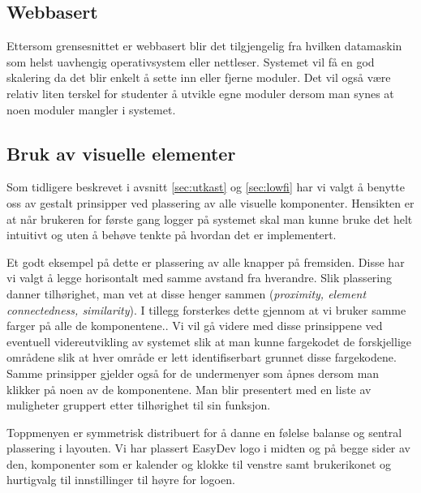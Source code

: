 \subsection{Webbasert}
Ettersom grensesnittet er webbasert blir det tilgjengelig fra hvilken datamaskin som helst uavhengig operativsystem eller nettleser. Systemet vil få en god skalering da det blir enkelt å sette inn eller fjerne moduler. Det vil også være relativ liten terskel for studenter å utvikle egne moduler dersom man synes at noen moduler mangler i systemet. 

\subsection{Bruk av visuelle elementer}
Som tidligere beskrevet i avsnitt \ref{sec:utkast} og \ref{sec:lowfi} har vi valgt å benytte oss av gestalt prinsipper ved plassering av alle visuelle komponenter. Hensikten er at når brukeren for første gang logger på systemet skal man kunne bruke det helt intuitivt og uten å behøve tenkte på hvordan det er implementert.

Et godt eksempel på dette er plassering av alle knapper på fremsiden. Disse har vi valgt å legge horisontalt med samme avstand fra hverandre. Slik plassering danner tilhørighet, man vet at disse henger sammen (\textit{proximity, element connectedness, similarity}). I tillegg forsterkes dette gjennom at vi bruker samme farger på alle de komponentene.\cite{forelesning:tulpesh}. Vi vil gå videre med disse prinsippene ved eventuell videreutvikling av systemet slik at man kunne fargekodet de forskjellige områdene slik at hver område er lett identifiserbart grunnet disse fargekodene. 
Samme prinsipper gjelder også for de undermenyer som åpnes dersom man klikker på noen av de komponentene. Man blir presentert med en liste av muligheter gruppert etter tilhørighet til sin funksjon. 

Toppmenyen er symmetrisk distribuert for å danne en følelse balanse og sentral plassering i layouten. Vi har plassert EasyDev logo i midten og på begge sider av den, komponenter som er kalender og klokke til venstre samt brukerikonet og hurtigvalg til innstillinger til høyre for logoen. 

